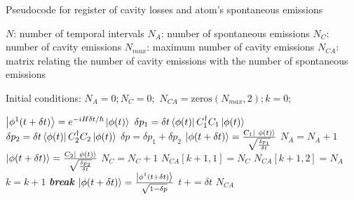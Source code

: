 \documentclass[conference]{IEEEtran}
\begin{document}
\begin{algorithm}[!t]
\caption{Pseudocode for register of cavity losses and atom's spontaneous emissions}
\label{alg1}
\begin{algorithmic}
\STATE $N$: number of temporal intervals
\STATE $N_A $: number of spontaneous emissions
\STATE $N_C$: number of cavity emissions
\STATE $N_{max}$: maximum number of cavity emissions
\STATE $N_{CA}$: matrix relating the number of cavity emissions with the number of spontaneous emissions

\STATE
\STATE Initial conditions:
\STATE $N_A = 0; N_C = 0;$
\STATE $N_{CA} = \text{zeros}(N_{max},2);  k = 0;$ 
\STATE 

\STATE $\ket{ \phi^1(t + \delta t)} = e^{-iH\delta t/\hbar}\ket{\phi (t)}$
\STATE$ \delta p_1 = \delta t\bra{\phi(t)}C^\dagger_1 C_1\ket{\phi(t)}$
\STATE $ \delta p_2 =  \delta t\bra{\phi(t)}C^\dagger_2 C_2\ket{\phi(t)}$
\STATE $\delta p = \delta p_1 + \delta p_2$
\STATE $\ket{\phi (t + \delta t)} = \frac{C_1 \ket{ \ \phi(t)}}{\sqrt \frac{\delta p_1}{\delta t}}$
\STATE $N_A = N_A + 1$
\ELSE
\STATE $\ket{\phi (t + \delta t)} = \frac{C_2 \ket{ \ \phi(t)}}{\sqrt \frac{\delta p_2}{\delta t}}$
\STATE $N_C = N_C + 1$
\STATE $N_{CA}[k+1,1] = N_C$
\STATE  $N_{CA}[k+1,2] = N_A$
\STATE $k = k+1$
\STATE \textbf{\textit{break}}
\ENDIF
\ENDIF
\ELSE
\STATE $\ket{ \phi(t + \delta t)} = \frac{\ket{\phi^1 (t+ \delta t)}}{\sqrt{1-\delta p}}$
\STATE $t \ += \delta t$
\ENDIF
\ENDFOR
\RETURN  $N_{CA}$
\end{algorithmic}
\end{algorithm}
\end{document}
